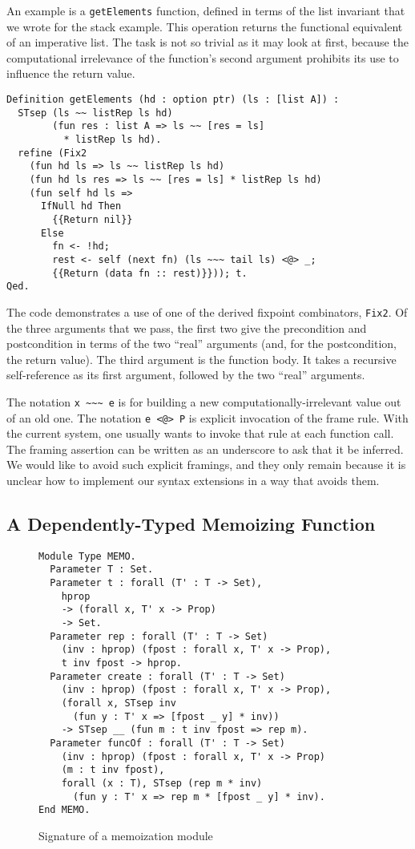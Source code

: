 \documentclass[preprint,nocopyrightspace]{sigplanconf}
\newcommand{\cd}[1]{\texttt{#1}}
\begin{document}
An example is a \cd{getElements} function, defined in terms of the list invariant that we wrote for the stack example.  This operation returns the functional equivalent of an imperative list.  The task is not so trivial as it may look at first, because the computational irrelevance of the function's second argument prohibits its use to influence the return value.

\begin{verbatim}
Definition getElements (hd : option ptr) (ls : [list A]) :
  STsep (ls ~~ listRep ls hd)
        (fun res : list A => ls ~~ [res = ls]
          * listRep ls hd).
  refine (Fix2
    (fun hd ls => ls ~~ listRep ls hd)
    (fun hd ls res => ls ~~ [res = ls] * listRep ls hd)
    (fun self hd ls => 
      IfNull hd Then
        {{Return nil}}
      Else
        fn <- !hd;
        rest <- self (next fn) (ls ~~~ tail ls) <@> _;
        {{Return (data fn :: rest)}})); t.
Qed.
\end{verbatim}

The code demonstrates a use of one of the derived fixpoint combinators, \cd{Fix2}.  Of the three arguments that we pass, the first two give the precondition and postcondition in terms of the two ``real'' arguments (and, for the postcondition, the return value).  The third argument is the function body.  It takes a recursive self-reference as its first argument, followed by the two ``real'' arguments.

The notation \cd{x \textasciitilde\textasciitilde\textasciitilde \; e} is for building a new computationally-irrelevant value out of an old one.  The notation \cd{e <@> P} is explicit invocation of the frame rule.  With the current system, one usually wants to invoke that rule at each function call.  The framing assertion can be written as an underscore to ask that it be inferred.  We would like to avoid such explicit framings, and they only remain because it is unclear how to implement our syntax extensions in a way that avoids them.


\subsection{A Dependently-Typed Memoizing Function}

\begin{figure}
  \begin{verbatim}
Module Type MEMO.
  Parameter T : Set.
  Parameter t : forall (T' : T -> Set),
    hprop
    -> (forall x, T' x -> Prop)
    -> Set.
  Parameter rep : forall (T' : T -> Set)
    (inv : hprop) (fpost : forall x, T' x -> Prop),
    t inv fpost -> hprop.
  Parameter create : forall (T' : T -> Set)
    (inv : hprop) (fpost : forall x, T' x -> Prop),
    (forall x, STsep inv
      (fun y : T' x => [fpost _ y] * inv))
    -> STsep __ (fun m : t inv fpost => rep m).
  Parameter funcOf : forall (T' : T -> Set)
    (inv : hprop) (fpost : forall x, T' x -> Prop)
    (m : t inv fpost),
    forall (x : T), STsep (rep m * inv)
      (fun y : T' x => rep m * [fpost _ y] * inv).
End MEMO.
  \end{verbatim}
  \caption{\label{memoize}Signature of a memoization module}
\end{figure}
\end{document}
